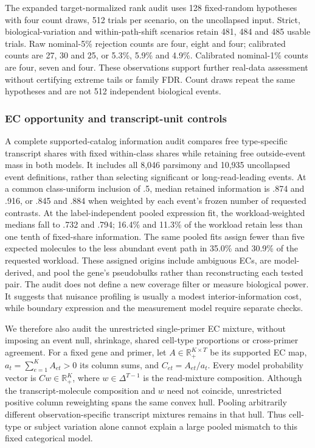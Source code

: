 \documentclass[11pt]{article}
\begin{document}
The expanded target-normalized rank audit uses 128 fixed-random hypotheses with four count draws, 512 trials per scenario, on the uncollapsed input. Strict, biological-variation and within-path-shift scenarios retain 481, 484 and 485 usable trials. Raw nominal-5\% rejection counts are four, eight and four; calibrated counts are 27, 30 and 25, or 5.3\%, 5.9\% and 4.9\%. Calibrated nominal-1\% counts are four, seven and four. These observations support further real-data assessment without certifying extreme tails or family FDR. Count draws repeat the same hypotheses and are not 512 independent biological events.

\subsubsection*{EC opportunity and transcript-unit controls}

A complete supported-catalog information audit compares free type-specific transcript shares with fixed within-class shares while retaining free outside-event mass in both models. It includes all 8,046 parsimony and 10,935 uncollapsed event definitions, rather than selecting significant or long-read-leading events. At a common class-uniform inclusion of .5, median retained information is .874 and .916, or .845 and .884 when weighted by each event's frozen number of requested contrasts. At the label-independent pooled expression fit, the workload-weighted medians fall to .732 and .794; 16.4\% and 11.3\% of the workload retain less than one tenth of fixed-share information. The same pooled fits assign fewer than five expected molecules to the less abundant event path in 35.0\% and 30.9\% of the requested workload. These assigned origins include ambiguous ECs, are model-derived, and pool the gene's pseudobulks rather than reconstructing each tested pair. The audit does not define a new coverage filter or measure biological power. It suggests that nuisance profiling is usually a modest interior-information cost, while boundary expression and the measurement model require separate checks.

We therefore also audit the unrestricted single-primer EC mixture, without imposing an event null, shrinkage, shared cell-type proportions or cross-primer agreement. For a fixed gene and primer, let \(A\in\mathbb R_+^{K\times T}\) be its supported EC map, \(a_t=\sum_{e=1}^K A_{et}>0\) its column sums, and \(C_{et}=A_{et}/a_t\). Every model probability vector is \(Cw\in\mathbb R_+^K\), where \(w\in\Delta^{T-1}\) is the read-mixture composition. Although the transcript-molecule composition and \(w\) need not coincide, unrestricted positive column reweighting spans the same convex hull. Pooling arbitrarily different observation-specific transcript mixtures remains in that hull. Thus cell-type or subject variation alone cannot explain a large pooled mismatch to this fixed categorical model.
\end{document}
